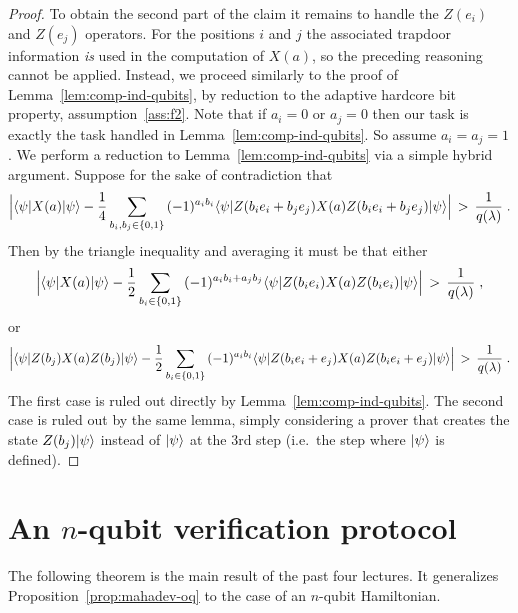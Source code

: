 \begin{proof}
	To obtain the second part of the claim it remains to handle the $Z(e_i)$ and $Z(e_j)$ operators. For the positions $i$ and $j$ the associated trapdoor information \emph{is} used in the computation of $X(a)$, so the preceding reasoning cannot be applied. Instead, we proceed similarly to the proof of Lemma~\ref{lem:comp-ind-qubits}, by reduction to the adaptive hardcore bit property, assumption~\ref{ass:f2}. Note that if $a_i=0$ or $a_j=0$ then our task is exactly the task handled in Lemma~\ref{lem:comp-ind-qubits}. So assume $a_i=a_j=1$. We perform a reduction to Lemma~\ref{lem:comp-ind-qubits} via a simple hybrid argument. Suppose for the sake of contradiction that 
	\[ \Big| \langle\psi| X(a) |\psi\rangle -  \frac{1}{4} \sum_{b_i,b_j\in \{0,1\}}\,  (-1)^{a_ib_i} \langle\psi| Z(b_i e_i + b_j e_j) X(a) Z(b_i e_i + b_j e_j) |\psi\rangle\Big|\,>\, \frac{1}{q(\lambda)}\;.\]
	Then by the triangle inequality and averaging it must be that either 
		\[ \Big| \langle\psi| X(a) |\psi\rangle -  \frac{1}{2} \sum_{b_i\in \{0,1\}}\,  (-1)^{a_ib_i+a_jb_j} \langle\psi| Z(b_i e_i) X(a) Z(b_i e_i ) |\psi\rangle\Big|\,>\, \frac{1}{q(\lambda)}\;,\]
	or
		\[ \Big| \langle\psi|Z(b_j) X(a) Z(b_j)|\psi\rangle - \frac{1}{2} \sum_{b_i\in \{0,1\}}\,  (-1)^{a_ib_i} \langle\psi| Z(b_i e_i + e_j) X(a) Z(b_i e_i + e_j ) |\psi\rangle\Big|\,>\, \frac{1}{q(\lambda)}\;.\]
	The first case is ruled out directly by Lemma~\ref{lem:comp-ind-qubits}. The second case is ruled out by the same lemma, simply considering a prover that creates the state $Z(b_j) |\psi\rangle$ instead of $|\psi\rangle$ at the 3rd step (i.e.\ the step where $|\psi\rangle$ is defined). 
	\end{proof}

\section{An $n$-qubit verification protocol}
\label{sec:nqubit-verification}

The following theorem is the main result of the past four lectures. It generalizes Proposition~\ref{prop:mahadev-oq} to the case of an $n$-qubit Hamiltonian. 

